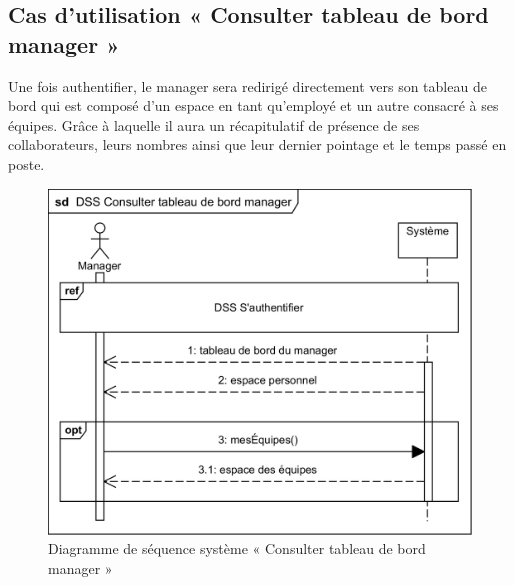     \subsection{Cas d'utilisation « Consulter tableau de bord manager »}
    Une fois authentifier, le manager sera redirigé directement vers son tableau de bord qui est composé d’un espace en tant qu’employé et un autre consacré à ses équipes. Grâce à laquelle il aura un récapitulatif de présence de ses collaborateurs, leurs nombres ainsi que leur dernier pointage et le temps passé en poste.
        \begin{figure}[h!]
             \centering
            \includegraphics[scale=1]{images/DSS/DSS Consulter tableau de bord manager.png}
             \caption{Diagramme de séquence système « Consulter tableau de bord manager »}
             \label{fig4}
        \end{figure}
    \vspace{-30pt}
